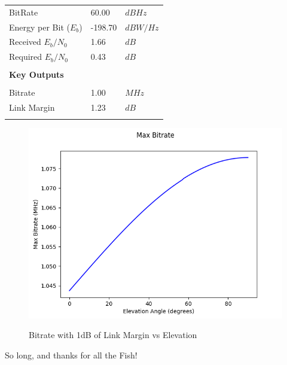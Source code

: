 \documentclass{article}
\begin{document}
\begin{center}
\begin{tabular}{p{3in}p{1in}l}
BitRate & 60.00 & $dBHz$ \\
Energy per Bit ($E_b$) & -198.70 & $dBW/Hz$ \\
Received $E_b/N_0$ & 1.66 & $dB$ \\
Required $E_b/N_0$ & 0.43 & $dB$ \\
\\
\textbf{Key Outputs} & & \\
\hline \\
Bitrate & 1.00 & $MHz$ \\
Link Margin & 1.23 & $dB$ \\
\\
\end{tabular}

  
  \begin{figure}
    \caption{Bitrate with 1dB of Link Margin vs Elevation}
    \includegraphics[width=\linewidth]{./max-bitrate.png}
    \label{fig::pfd::max-bitrate}
  \end{figure}
        
\end{center}

\newpage
So long, and thanks for all the Fish!

\end{document}
